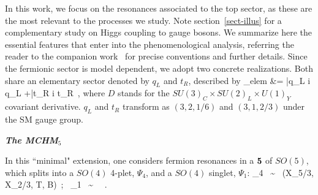 In this work, we focus on the resonances associated to the top sector,
as these are the most relevant to the processes we study. Note section~\ref{sect-illus} for a complementary study on Higgs coupling to gauge bosons.  We
summarize here the essential features that enter into the
phenomenological analysis, referring the reader to the companion
work~\cite{MCHMtthh} for precise conventions and further details.
Since the fermionic sector is model dependent, we adopt two concrete
realizations.  Both share an elementary sector denoted by $q_L$ and
$t_R$, described by
%
\bea
{}_{\rm elem} &= \bar{q}_L i  q_L +\bar{t}_R i  t_R~,
\label{elem}
\eea
%
where $D$ stands for the $SU(3)_C \times SU(2)_L \times U(1)_Y$
covariant derivative.  $q_L$ and $t_R$ transform as $(3,2,1/6)$ and
$(3,1,2/3)$ under the SM gauge group.

\medskip
\noindent
\textit{\small \bf The MCHM$_5$}
\medskip

In this ``minimal" extension, one considers fermion resonances in a
${\bf 5}$ of $SO(5)$, which splits into a $SO(4)$ 4-plet,
$\Psi_4$, and a $SO(4)$ singlet, $\Psi_1$:
%
\be
\Psi_4 ~\sim~ (X_{5/3}, X_{2/3}, T, B)~;~   \Psi_1 ~\sim~ ~.
\label{comp5content}
\ee
%

